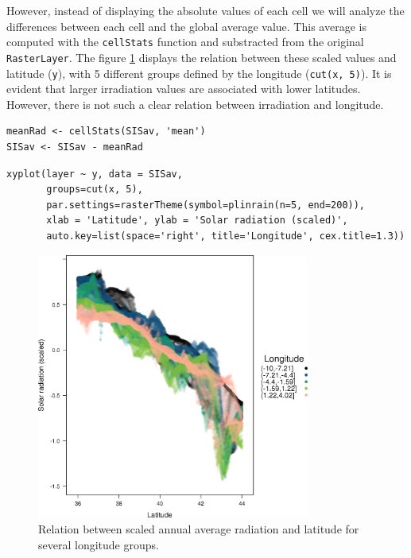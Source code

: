 However, instead of displaying the absolute values of each cell we
will analyze the differences between each cell and the global
average value. This average is computed with the \texttt{cellStats}
function and substracted from the original \texttt{RasterLayer}. The
figure \ref{fig:xyplotSISav} displays the relation between these
scaled values and latitude (\texttt{y}), with 5 different groups defined
by the longitude (\texttt{cut(x, 5)}). It is evident that larger
irradiation values are associated with lower latitudes. However,
there is not such a clear relation between irradiation and
longitude.


\lstset{language=R}
\begin{lstlisting}
meanRad <- cellStats(SISav, 'mean')
SISav <- SISav - meanRad
\end{lstlisting}


\lstset{language=R}
\begin{lstlisting}
xyplot(layer ~ y, data = SISav,
       groups=cut(x, 5),
       par.settings=rasterTheme(symbol=plinrain(n=5, end=200)),
       xlab = 'Latitude', ylab = 'Solar radiation (scaled)',  
       auto.key=list(space='right', title='Longitude', cex.title=1.3))
\end{lstlisting}

\begin{figure}[h!]
\centering
\includegraphics[width=0.8\textwidth]{figs/xyplotSISav.png}
\caption{\label{fig:xyplotSISav}Relation between scaled annual average radiation and latitude for several longitude groups.}
\end{figure}

